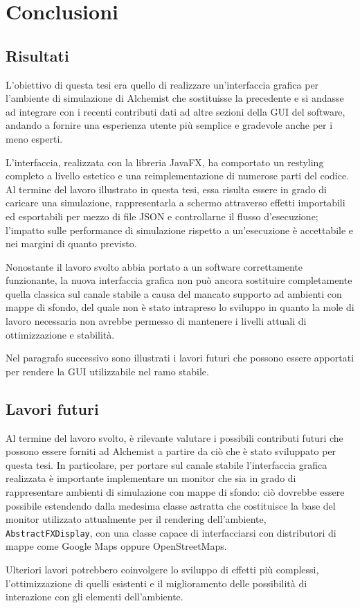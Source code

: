 
\chapter{Conclusioni}\label{ch:conclusioni}
    \section{Risultati}\label{sec:risultati}
        L'obiettivo di questa tesi era quello di realizzare un'interfaccia grafica per l'ambiente di simulazione di Alchemist che sostituisse la precedente e si andasse ad integrare con i recenti contributi dati ad altre sezioni della GUI del software, andando a fornire una esperienza utente più semplice e gradevole anche per i meno esperti.

        L'interfaccia, realizzata con la libreria JavaFX, ha comportato un restyling completo a livello estetico e una reimplementazione di numerose parti del codice.
        Al termine del lavoro illustrato in questa tesi, essa risulta essere in grado di caricare una simulazione, rappresentarla a schermo attraverso effetti importabili ed esportabili per mezzo di file JSON e controllarne il flusso d'esecuzione;
        l'impatto sulle performance di simulazione rispetto a un'esecuzione  è accettabile e nei margini di quanto previsto.

        Nonostante il lavoro svolto abbia portato a un software correttamente funzionante, la nuova interfaccia grafica non può ancora sostituire completamente quella classica sul canale stabile a causa del mancato supporto ad ambienti con mappe di sfondo, del quale non è stato intrapreso lo sviluppo in quanto la mole di lavoro necessaria non avrebbe permesso di mantenere i livelli attuali di ottimizzazione e stabilità.

        Nel paragrafo successivo sono illustrati i lavori futuri che possono essere apportati per rendere la GUI utilizzabile nel ramo stabile.

    \section{Lavori futuri}\label{sec:futuro}
        Al termine del lavoro svolto, è rilevante valutare i possibili contributi futuri che possono essere forniti ad Alchemist a partire da ciò che è stato sviluppato per questa tesi.
        In particolare, per portare sul canale stabile l'interfaccia grafica realizzata è importante implementare un monitor che sia in grado di rappresentare ambienti di simulazione con mappe di sfondo: ciò dovrebbe essere possibile estendendo dalla medesima classe astratta che costituisce la base del monitor utilizzato attualmente per il rendering dell'ambiente, \texttt{AbstractFXDisplay}, con una classe capace di interfacciarsi con distributori di mappe come Google Maps oppure OpenStreetMaps.

        Ulteriori lavori potrebbero coinvolgere lo sviluppo di effetti più complessi, l'ottimizzazione di quelli esistenti e il miglioramento delle possibilità di interazione con gli elementi dell'ambiente.
